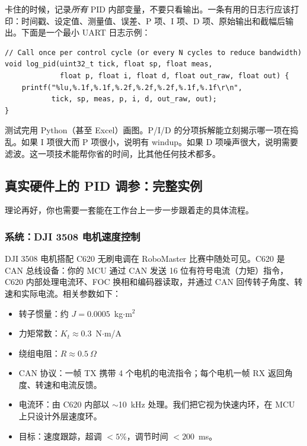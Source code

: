卡住的时候，记录\textit{所有} PID 内部变量，不要只看输出。一条有用的日志行应该打印：时间戳、设定值、测量值、误差、P 项、I 项、D 项、原始输出和截幅后输出。下面是一个最小 UART 日志示例：

\begin{verbatim}
// Call once per control cycle (or every N cycles to reduce bandwidth)
void log_pid(uint32_t tick, float sp, float meas,
             float p, float i, float d, float out_raw, float out) {
    printf("%lu,%.1f,%.1f,%.2f,%.2f,%.2f,%.1f,%.1f\r\n",
           tick, sp, meas, p, i, d, out_raw, out);
}
\end{verbatim}

测试完用 Python（甚至 Excel）画图。P/I/D 的分项拆解能立刻揭示哪一项在捣乱。如果 I 项很大而 P 项很小，说明有 windup。如果 D 项噪声很大，说明需要滤波。这一项技术能帮你省的时间，比其他任何技术都多。

\subsection{真实硬件上的 PID 调参：完整实例}

理论再好，你也需要一套能在工作台上一步一步跟着走的具体流程。

\subsubsection{系统：DJI 3508 电机速度控制}

DJI 3508 电机搭配 C620 无刷电调在 RoboMaster 比赛中随处可见。C620 是 CAN 总线设备：你的 MCU 通过 CAN 发送 16 位有符号电流（力矩）指令，C620 内部处理电流环、FOC 换相和编码器读取，并通过 CAN 回传转子角度、转速和实际电流。相关参数如下：
\begin{itemize}
    \item 转子惯量：约 $J = 0.0005$~kg$\cdot$m$^2$
    \item 力矩常数：$K_t \approx 0.3$~N$\cdot$m/A
    \item 绕组电阻：$R \approx 0.5~\Omega$
    \item CAN 协议：一帧 TX 携带 4 个电机的电流指令；每个电机一帧 RX 返回角度、转速和电流反馈。
    \item 电流环：由 C620 内部以 $\sim$10~kHz 处理。我们把它视为快速内环，在 MCU 上只设计外层速度环。
    \item 目标：速度跟踪，超调 $<5\%$，调节时间 $<200$~ms。
\end{itemize}

